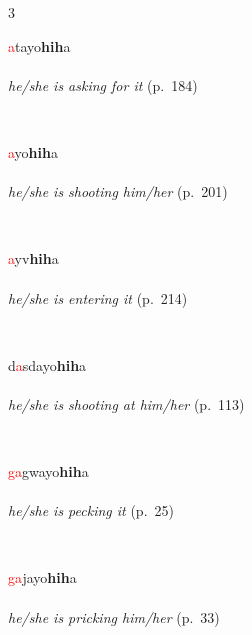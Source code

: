 \documentclass[oneside,openany]{book}%
\begin{document}
\noindent\begin{multicols}{3}%
\begin{minipage}[t]{\linewidth}
\raggedright\noindent \textcolor{Red}{a}tayo\textbf{hih}a\\
\\
\noindent \textit{he/she is asking for it} (p.~184)
\end{minipage}\\[1em]%
\begin{minipage}[t]{\linewidth}
\raggedright\noindent \textcolor{Red}{a}yo\textbf{hih}a\\
\\
\noindent \textit{he/she is shooting him/her} (p.~201)
\end{minipage}\\[1em]%
\begin{minipage}[t]{\linewidth}
\raggedright\noindent \textcolor{Red}{a}yv\textbf{hih}a\\
\\
\noindent \textit{he/she is entering it} (p.~214)
\end{minipage}\\[1em]%
\begin{minipage}[t]{\linewidth}
\raggedright\noindent d\textcolor{Red}{a}sdayo\textbf{hih}a\\
\\
\noindent \textit{he/she is shooting at him/her} (p.~113)
\end{minipage}\\[1em]%
\begin{minipage}[t]{\linewidth}
\raggedright\noindent \textcolor{Red}{ga}gwayo\textbf{hih}a\\
\\
\noindent \textit{he/she is pecking it} (p.~25)
\end{minipage}\\[1em]%
\begin{minipage}[t]{\linewidth}
\raggedright\noindent \textcolor{Red}{ga}jayo\textbf{hih}a\\
\\
\noindent \textit{he/she is pricking him/her} (p.~33)
\end{minipage}\\[1em]%
\end{multicols}%
\vspace{1em}%
\needspace{3in}%
\end{document}
